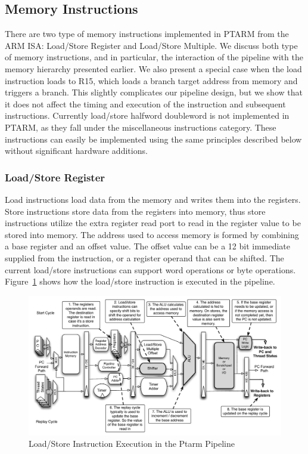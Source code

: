 \subsection{Memory Instructions}
There are two type of memory instructions implemented in PTARM from the ARM ISA: Load/Store Register and Load/Store Multiple.
We discuss both type of memory instructions, and in particular, the interaction of the pipeline with the memory hierarchy presented earlier. 
We also present a special case when the load instruction loads to R15, which loads a branch target address from memory and triggers a branch.  
This slightly complicates our pipeline design, but we show that it does not affect the timing and execution of the instruction and subsequent instructions.
Currently load/store halfword doubleword is not implemented in PTARM, as they fall under the miscellaneous instructions category. 
These instructions can easily be implemented using the same principles described below without significant hardware additions.       
  
\subsubsection{Load/Store Register}
Load instructions load data from the memory and writes them into the registers.
Store instructions store data from the registers into memory, thus store instructions utilize the extra register read port to read in the register value to be stored into memory.
The address used to access memory is formed by combining a base register and an offset value.
The offset value can be a 12 bit immediate supplied from the instruction, or a register operand that can be shifted.
The current load/store instructions can support word operations or byte operations.
Figure~\ref{fig:ldstr_pipeline_implementation} shows how the load/store instruction is executed in the pipeline.

\begin{figure}
  \vspace{-20pt}
  \begin{center}
    \includegraphics[scale=.54]{figs/ldstr_pipeline_implementation}
  \end{center}
  \vspace{-20pt}
  \caption{Load/Store Instruction Execution in the Ptarm Pipeline}
  \label{fig:ldstr_pipeline_implementation}
\end{figure}

